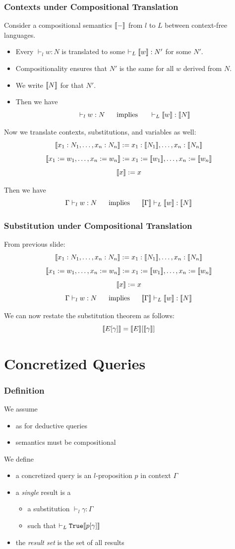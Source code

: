 \begin{frame}\frametitle{Contexts under Compositional Translation}
Consider a compositional semantics $\llbracket -\rrbracket$ from $l$ to $L$ between context-free languages.

\begin{itemize}
 \item Every $\vdash_l w:N$ is translated to some $\vdash_L \llbracket w\rrbracket:N'$ for some $N'$.
 \item Compositionality ensures that $N'$ is the same for all $w$ derived from $N$.
 \item We write $\llbracket N\rrbracket$ for that $N'$.
 \item Then we have 
  \[\vdash_l w:N \hspace*{.5cm}\;\mathrm{implies}\;\hspace*{.5cm} \vdash_L \llbracket w\rrbracket:\llbracket N\rrbracket\]
\end{itemize}

Now we translate contexts, substitutions, and variables as well:
\[\llbracket x_1:N_1,\ldots,x_n:N_n\rrbracket:=x_1:\llbracket N_1\rrbracket,\ldots,x_n:\llbracket N_n\rrbracket\]
\[\llbracket x_1:=w_1,\ldots,x_n:=w_n\rrbracket:=x_1:=\llbracket w_1\rrbracket,\ldots,x_n:=\llbracket w_n\rrbracket\]
\[\llbracket x\rrbracket:=x\]

Then we have
  \[\Gamma\vdash_l w:N \hspace*{.5cm}\;\mathrm{implies}\;\hspace*{.5cm} \llbracket \Gamma\rrbracket\vdash_L \llbracket w\rrbracket:\llbracket N\rrbracket\]
\end{frame}

\begin{frame}\frametitle{Substitution under Compositional Translation}
From previous slide:
\[\llbracket x_1:N_1,\ldots,x_n:N_n\rrbracket:=x_1:\llbracket N_1\rrbracket,\ldots,x_n:\llbracket N_n\rrbracket\]
\[\llbracket x_1:=w_1,\ldots,x_n:=w_n\rrbracket:=x_1:=\llbracket w_1\rrbracket,\ldots,x_n:=\llbracket w_n\rrbracket\]
\[\llbracket x\rrbracket:=x\]
\[\Gamma\vdash_l w:N \hspace*{.5cm}\;\mathrm{implies}\;\hspace*{.5cm} \llbracket \Gamma\rrbracket\vdash_L \llbracket w\rrbracket:\llbracket N\rrbracket\]

We can now restate the substitution theorem as follows:
  \[\llbracket E[\gamma]\rrbracket=\llbracket E\rrbracket[\llbracket \gamma\rrbracket]\]
\end{frame}

\section{Concretized Queries}

\begin{frame}\frametitle{Definition}
We assume
\begin{itemize}
\item as for deductive queries
\item semantics must be compositional
\end{itemize}

We define
\begin{itemize}
\item a concretized query is an $l$-proposition $p$ in context $\Gamma$
\item a \emph{single} result is a
 \begin{itemize}
 \item a substitution $\vdash_l \gamma:\Gamma$
 \item such that $\vdash_L \mathtt{True} \llbracket p[\gamma]\rrbracket$
 \end{itemize}
\item the \emph{result set} is the set of all results
\end{itemize}
\end{frame}

